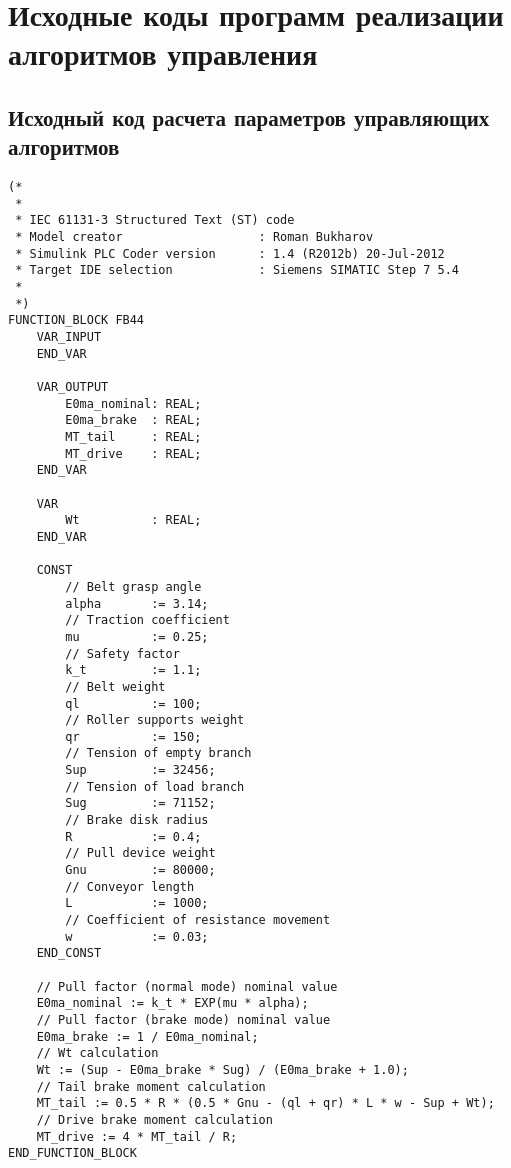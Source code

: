 \chapter{Исходные коды программ реализации алгоритмов управления} \label{AppendixB}                      

\section{Исходный код расчета параметров управляющих алгоритмов} \label{AppendixB1}
\fontsize{11pt}{12pt}\selectfont

\begin{verbatim}
(*
 *
 * IEC 61131-3 Structured Text (ST) code
 * Model creator                   : Roman Bukharov
 * Simulink PLC Coder version      : 1.4 (R2012b) 20-Jul-2012
 * Target IDE selection            : Siemens SIMATIC Step 7 5.4
 *
 *)
FUNCTION_BLOCK FB44
    VAR_INPUT
    END_VAR
    
    VAR_OUTPUT
        E0ma_nominal: REAL;
        E0ma_brake  : REAL;
        MT_tail     : REAL;
        MT_drive    : REAL;
    END_VAR
    
    VAR
        Wt          : REAL;
    END_VAR
    
    CONST
        // Belt grasp angle 
        alpha       := 3.14;
        // Traction coefficient 
        mu          := 0.25;
        // Safety factor 
        k_t         := 1.1;
        // Belt weight 
        ql          := 100;
        // Roller supports weight 
        qr          := 150;
        // Tension of empty branch 
        Sup         := 32456;
        // Tension of load branch 
        Sug         := 71152;
        // Brake disk radius 
        R           := 0.4;
        // Pull device weight 
        Gnu         := 80000;
        // Conveyor length 
        L           := 1000;
        // Coefficient of resistance movement 
        w           := 0.03;
    END_CONST
    
    // Pull factor (normal mode) nominal value 
    E0ma_nominal := k_t * EXP(mu * alpha);
    // Pull factor (brake mode) nominal value 
    E0ma_brake := 1 / E0ma_nominal;
    // Wt calculation
    Wt := (Sup - E0ma_brake * Sug) / (E0ma_brake + 1.0);
    // Tail brake moment calculation 
    MT_tail := 0.5 * R * (0.5 * Gnu - (ql + qr) * L * w - Sup + Wt);
    // Drive brake moment calculation
    MT_drive := 4 * MT_tail / R;
END_FUNCTION_BLOCK

\end{verbatim}

